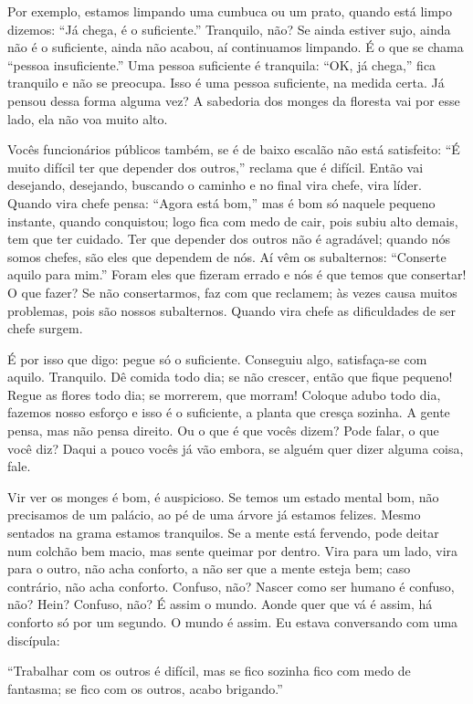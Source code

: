 Por exemplo, estamos limpando uma cumbuca ou um prato, quando está
limpo dizemos: “Já chega, é o suficiente.” Tranquilo, não? Se ainda
estiver sujo, ainda não é o suficiente, ainda não acabou, aí
continuamos limpando. É o que se chama “pessoa insuficiente.” Uma
pessoa suficiente é tranquila: “\textsc{OK}, já chega,” fica tranquilo e não se
preocupa. Isso é uma pessoa suficiente, na medida certa. Já pensou
dessa forma alguma vez? A sabedoria dos monges da floresta vai por esse
lado, ela não voa muito alto.

Vocês funcionários públicos também, se é de baixo escalão não está
satisfeito: “É muito difícil ter que depender dos outros,” reclama que
é difícil. Então vai desejando, desejando, buscando o caminho e no
final vira chefe, vira líder. Quando vira chefe pensa: “Agora está
bom,” mas é bom só naquele pequeno instante, quando conquistou; logo
fica com medo de cair, pois subiu alto demais, tem que ter cuidado. Ter
que depender dos outros não é agradável; quando nós somos chefes, são
eles que dependem de nós. Aí vêm os subalternos: “Conserte aquilo para
mim.” Foram eles que fizeram errado e nós é que temos que consertar! O
que fazer? Se não consertarmos, faz com que reclamem; às vezes causa
muitos problemas, pois são nossos subalternos. Quando vira chefe as
dificuldades de ser chefe surgem.

É por isso que digo: pegue só o suficiente. Conseguiu algo,
satisfaça-se com aquilo. Tranquilo. Dê comida todo dia; se não crescer,
então que fique pequeno! Regue as flores todo dia; se morrerem, que
morram! Coloque adubo todo dia, fazemos nosso esforço e isso é o
suficiente, a planta que cresça sozinha. A gente pensa, mas não pensa
direito. Ou o que é que vocês dizem? Pode falar, o que você diz? Daqui
a pouco vocês já vão embora, se alguém quer dizer alguma coisa, fale. 

Vir ver os monges é bom, é auspicioso. Se temos um estado mental
bom, não precisamos de um palácio, ao pé de uma árvore já estamos
felizes. Mesmo sentados na grama estamos tranquilos. Se a mente está
fervendo, pode deitar num colchão bem macio, mas sente queimar por
dentro. Vira para um lado, vira para o outro, não acha conforto, a não
ser que a mente esteja bem; caso contrário, não acha conforto. Confuso,
não? Nascer como ser humano é confuso, não? Hein? Confuso, não? É assim
o mundo. Aonde quer que vá é assim, há conforto só por um segundo. O
mundo é assim. Eu estava conversando com uma discípula: 

“Trabalhar com os outros é difícil, mas se fico sozinha fico com
medo de fantasma; se fico com os outros, acabo brigando.”

